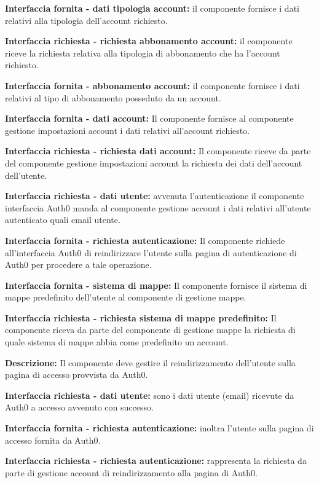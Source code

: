 \begin{listaPersonale}[DCI]{}
    \textbf{Interfaccia fornita - dati tipologia account:} il componente fornisce i dati relativi alla tipologia dell'account richiesto.

    \textbf{Interfaccia richiesta - richiesta abbonamento account:} il componente riceve la richiesta relativa alla tipologia di abbonamento che ha l'account richiesto.

    \textbf{Interfaccia fornita - abbonamento account:} il componente fornisce i dati relativi al tipo di abbonamento posseduto da un account.

    \textbf{Interfaccia fornita - dati account:} Il componente fornisce al componente gestione impostazioni account i dati relativi all'account richiesto.

    \textbf{Interfaccia richiesta - richiesta dati account:} Il componente riceve da parte del componente gestione impostazioni account la richiesta dei dati dell'account dell'utente.

    \textbf{Interfaccia richiesta - dati utente:} avvenuta l'autenticazione il componente interfaccia Auth0 manda al componente gestione account i dati relativi all'utente autenticato quali email utente.

    \textbf{Interfaccia fornita - richiesta autenticazione:} Il componente richiede all'interfaccia Auth0 di reindirizzare l'utente sulla pagina di autenticazione di Auth0 per procedere a tale operazione.

    \textbf{Interfaccia fornita - sistema di mappe:} Il componente fornisce il sistema di mappe predefinito dell'utente al componente di gestione mappe.

    \textbf{Interfaccia richiesta - richiesta sistema di mappe predefinito:} Il componente riceva da parte del componente di gestione mappe la richiesta di quale sistema di mappe abbia come predefinito un account.



    \textbf{Descrizione:} Il componente deve gestire il reindirizzamento dell'utente sulla pagina di accesso provvista da Auth0. 

    \textbf{Interfaccia richiesta - dati utente:} sono i dati utente (email) ricevute da Auth0 a accesso avvenuto con successo.

    \textbf{Interfaccia fornita - richiesta autenticazione:} inoltra l'utente sulla pagina di accesso fornita da Auth0.

    \textbf{Interfaccia richiesta - richiesta autenticazione:} rappresenta la richiesta da parte di gestione account di reindirizzamento alla pagina di Auth0.


\end{listaPersonale}
